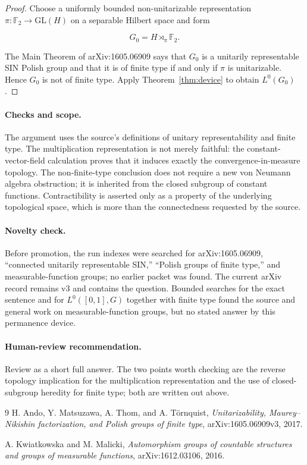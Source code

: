 \documentclass[11pt]{article}
\begin{document}
\begin{proof}
Choose a uniformly bounded non-unitarizable representation
\(\pi:\mathbb F_2\to\mathrm{GL}(H)\) on a separable Hilbert space and form

\[
 G_0=H\rtimes_{\pi}\mathbb F_2.
\]

The Main Theorem of arXiv:1605.06909 says that \(G_0\) is a unitarily
representable SIN Polish group and that it is of finite type if and only if
\(\pi\) is unitarizable.  Hence \(G_0\) is not of finite type.  Apply
Theorem~\ref{thm:device} to obtain \(L^0(G_0)\).
\end{proof}

\paragraph{Checks and scope.}
The argument uses the source's definitions of unitary representability and
finite type.  The multiplication representation is not merely faithful: the
constant-vector-field calculation proves that it induces exactly the
convergence-in-measure topology.  The non-finite-type conclusion does not
require a new von Neumann algebra obstruction; it is inherited from the
closed subgroup of constant functions.  Contractibility is asserted only as
a property of the underlying topological space, which is more than the
connectedness requested by the source.

\paragraph{Novelty check.}
Before promotion, the run indexes were searched for arXiv:1605.06909,
``connected unitarily representable SIN,'' ``Polish groups of finite type,''
and measurable-function groups; no earlier packet was found.  The current
arXiv record remains v3 and contains the question.  Bounded searches for the
exact sentence and for \(L^0([0,1],G)\) together with finite type found the
source and general work on measurable-function groups, but no stated answer
by this permanence device.

\paragraph{Human-review recommendation.}
Review as a short full answer.  The two points worth checking are the reverse
topology implication for the multiplication representation and the use of
closed-subgroup heredity for finite type; both are written out above.

\begin{thebibliography}{9}
H. Ando, Y. Matsuzawa, A. Thom, and A. T\"ornquist,
\emph{Unitarizability, Maurey--Nikishin factorization, and Polish groups of
finite type}, arXiv:1605.06909v3, 2017.

A. Kwiatkowska and M. Malicki,
\emph{Automorphism groups of countable structures and groups of measurable
functions}, arXiv:1612.03106, 2016.
\end{thebibliography}
\end{document}
